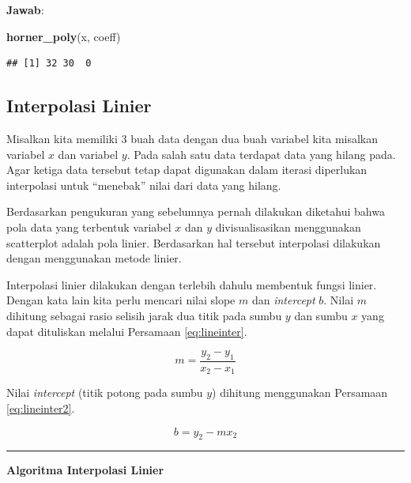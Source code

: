 \documentclass[
]{book}
\newenvironment{Shaded}{\begin{snugshade}}{\end{snugshade}}
\newcommand{\FunctionTok}[1]{\textcolor[rgb]{0.13,0.29,0.53}{\textbf{#1}}}
\newcommand{\NormalTok}[1]{#1}
\theoremstyle{definition}
\theoremstyle{definition}
\theoremstyle{definition}
\theoremstyle{definition}
\theoremstyle{remark}
\begin{document}
\textbf{Jawab}:

\begin{Shaded}
\begin{Highlighting}[]
\FunctionTok{horner\_poly}\NormalTok{(x, coeff)}
\end{Highlighting}
\end{Shaded}

\begin{verbatim}
## [1] 32 30  0
\end{verbatim}

\hypertarget{lininterpol}{%
\subsection{Interpolasi Linier}\label{lininterpol}}

Misalkan kita memiliki 3 buah data dengan dua buah variabel kita misalkan variabel \(x\) dan variabel \(y\). Pada salah satu data terdapat data yang hilang pada. Agar ketiga data tersebut tetap dapat digunakan dalam iterasi diperlukan interpolasi untuk ``menebak'' nilai dari data yang hilang.

Berdasarkan pengukuran yang sebelumnya pernah dilakukan diketahui bahwa pola data yang terbentuk variabel \(x\) dan \(y\) divisualisasikan menggunakan scatterplot adalah pola linier. Berdasarkan hal tersebut interpolasi dilakukan dengan menggunakan metode linier.

Interpolasi linier dilakukan dengan terlebih dahulu membentuk fungsi linier. Dengan kata lain kita perlu mencari nilai slope \(m\) dan \emph{intercept} \(b\). Nilai \(m\) dihitung sebagai rasio selisih jarak dua titik pada sumbu \(y\) dan sumbu \(x\) yang dapat dituliskan melalui Persamaan \eqref{eq:lineinter}.

\begin{equation}
m=\frac{y_2-y_1}{x_2-x_1}
  \label{eq:lineinter}
\end{equation}

Nilai \emph{intercept} (titik potong pada sumbu \(y\)) dihitung menggunakan Persamaan \eqref{eq:lineinter2}.

\begin{equation}
b=y_2-mx_2
  \label{eq:lineinter2}
\end{equation}

\begin{center}\rule{0.5\linewidth}{0.5pt}\end{center}

\textbf{Algoritma Interpolasi Linier}
\end{document}
